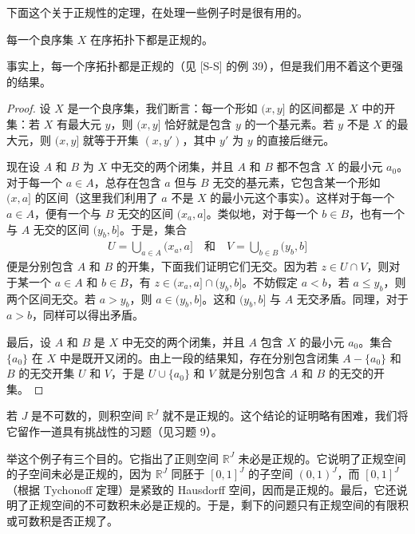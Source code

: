 下面这个关于正规性的定理，在处理一些例子时是很有用的。

\begin{theorem}\label{theorem:ch04-well-ordered-normal}
每一个良序集 $X$ 在序拓扑下都是正规的。
\end{theorem}

事实上，每一个序拓扑都是正规的（见 [S-S] 的例 39），但是我们用不着这个更强的结果。

\begin{proof}
设 $X$ 是一个良序集，我们断言：每一个形如 $(x,y]$ 的区间都是 $X$ 中的开集：若 $X$ 有最大元 $y$，则 $(x,y]$ 恰好就是包含 $y$ 的一个基元素。若 $y$ 不是 $X$ 的最大元，则 $(x,y]$ 就等于开集 $(x,y')$，其中 $y'$ 为 $y$ 的直接后继元。

现在设 $A$ 和 $B$ 为 $X$ 中无交的两个闭集，并且 $A$ 和 $B$ 都不包含 $X$ 的最小元 $a_{0}$。对于每一个 $a\in A$，总存在包含 $a$ 但与 $B$ 无交的基元素，它包含某一个形如 $(x,a]$ 的区间（这里我们利用了 $a$ 不是 $X$ 的最小元这个事实）。这样对于每一个 $a\in A$，便有一个与 $B$ 无交的区间 $(x_{a},a]$。类似地，对于每一个 $b\in B$，也有一个与 $A$ 无交的区间 $(y_{b},b]$。于是，集合
\begin{align*}
U=\bigcup_{a\in A}(x_{a},a]\quad\text{和}\quad V=\bigcup_{b\in B}(y_{b},b]
\end{align*}
便是分别包含 $A$ 和 $B$ 的开集，下面我们证明它们无交。因为若 $z\in U\cap V$，则对于某一个 $a\in A$ 和 $b\in B$，有 $z\in(x_{a},a]\cap(y_{b},b]$。不妨假定 $a<b$，若 $a\leqslant y_{b}$，则两个区间无交。若 $a>y_{b}$，则 $a\in(y_{b},b]$。这和 $(y_{b},b]$ 与 $A$ 无交矛盾。同理，对于 $a>b$，同样可以得出矛盾。

最后，设 $A$ 和 $B$ 是 $X$ 中无交的两个闭集，并且 $A$ 包含 $X$ 的最小元 $a_{0}$。集合 $\{a_{0}\}$ 在 $X$ 中是既开又闭的。由上一段的结果知，存在分别包含闭集 $A-\{a_{0}\}$ 和 $B$ 的无交开集 $U$ 和 $V$，于是 $U\cup\{a_{0}\}$ 和 $V$ 就是分别包含 $A$ 和 $B$ 的无交的开集。
\end{proof}

\begin{example}\label{example:ch04-rj-not-normal}
若 $J$ 是不可数的，则积空间 $\mathbb{R}^{J}$ 就不是正规的。这个结论的证明略有困难，我们将它留作一道具有挑战性的习题（见习题 9）。

举这个例子有三个目的。它指出了正则空间 $\mathbb{R}^{J}$ 未必是正规的。它说明了正规空间的子空间未必是正规的，因为 $\mathbb{R}^{J}$ 同胚于 $[0,1]^{J}$ 的子空间 $(0,1)^{J}$，而 $[0,1]^{J}$（根据 Tychonoff 定理）是紧致的 Hausdorff 空间，因而是正规的。最后，它还说明了正规空间的不可数积未必是正规的。于是，剩下的问题只有正规空间的有限积或可数积是否正规了。
\end{example}

